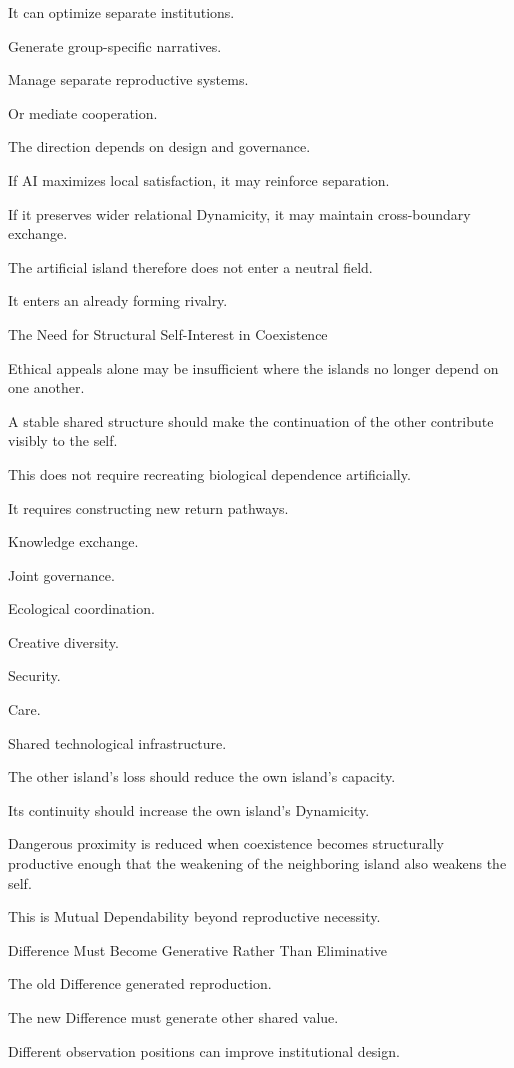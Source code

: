 It can optimize separate institutions.

Generate group-specific narratives.

Manage separate reproductive systems.

Or mediate cooperation.

The direction depends on design and governance.

If AI maximizes local satisfaction, it may reinforce separation.

If it preserves wider relational Dynamicity, it may maintain cross-boundary exchange.

The artificial island therefore does not enter a neutral field.

It enters an already forming rivalry.

The Need for Structural Self-Interest in Coexistence

Ethical appeals alone may be insufficient where the islands no longer depend on one another.

A stable shared structure should make the continuation of the other contribute visibly to the self.

This does not require recreating biological dependence artificially.

It requires constructing new return pathways.

Knowledge exchange.

Joint governance.

Ecological coordination.

Creative diversity.

Security.

Care.

Shared technological infrastructure.

The other island’s loss should reduce the own island’s capacity.

Its continuity should increase the own island’s Dynamicity.

Dangerous proximity is reduced when coexistence becomes structurally productive enough that the weakening of the neighboring island also weakens the self.

This is Mutual Dependability beyond reproductive necessity.

Difference Must Become Generative Rather Than Eliminative

The old Difference generated reproduction.

The new Difference must generate other shared value.

Different observation positions can improve institutional design.

